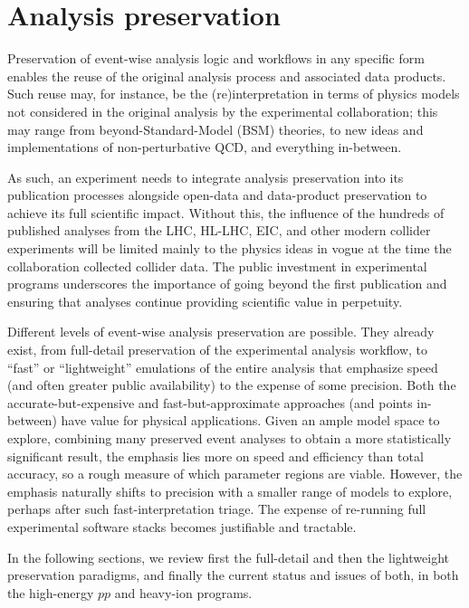 \documentclass[11pt]{article}
\begin{document}
\section{Analysis preservation}
\label{sec:analysis-preservation}


Preservation of event-wise analysis logic and workflows in any specific form enables the reuse of the original analysis process and associated data products. Such reuse may, for instance, be the  (re)interpretation in terms of physics models not considered in the original analysis by the experimental collaboration; this may range from beyond-Standard-Model (BSM) theories, to new ideas and implementations of non-perturbative QCD, and everything in-between.

As such, an experiment needs to integrate analysis preservation into its publication processes alongside open-data and data-product preservation to achieve its full scientific impact. Without this, the influence of the hundreds of published analyses from the LHC, HL-LHC, EIC, and other modern collider experiments will be limited mainly to the physics ideas in vogue at the time the collaboration collected collider data. The public investment in experimental programs underscores the importance of going beyond the first publication and ensuring that analyses continue providing scientific value in perpetuity.

Different levels of event-wise analysis preservation are possible.
They already exist, from full-detail preservation of the experimental analysis workflow, to ``fast'' or ``lightweight'' emulations of the entire analysis that emphasize speed (and often greater public availability) to the expense of some precision.
Both the accurate-but-expensive and fast-but-approximate approaches (and points in-between) have value for physical applications. Given an ample model space to explore, combining many preserved event analyses to obtain a more statistically significant result, the emphasis lies more on speed and efficiency than total accuracy, so a rough measure of which parameter regions are viable.
However, the emphasis naturally shifts to precision with a smaller range of models to explore, perhaps after such fast-interpretation triage.
The expense of re-running full experimental software stacks becomes justifiable and tractable.

In the following sections, we review first the full-detail and then the lightweight preservation paradigms, and finally the current status and issues of both, in both the high-energy $pp$ and heavy-ion programs.
\end{document}
